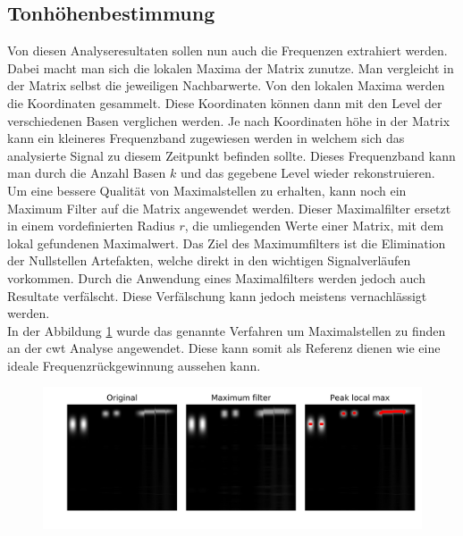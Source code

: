 \subsection{Tonhöhenbestimmung}

Von diesen Analyseresultaten sollen nun auch die Frequenzen extrahiert werden. Dabei macht man sich die lokalen Maxima der Matrix zunutze. Man vergleicht in der Matrix selbst die jeweiligen Nachbarwerte. Von den lokalen Maxima werden die Koordinaten gesammelt. Diese Koordinaten können dann mit den Level der verschiedenen Basen verglichen werden. Je nach Koordinaten höhe in der Matrix kann ein kleineres Frequenzband zugewiesen werden in welchem sich das analysierte Signal zu diesem Zeitpunkt befinden sollte. Dieses Frequenzband kann man durch die Anzahl Basen $k$  und das gegebene Level wieder rekonstruieren.\\

Um eine bessere Qualität von Maximalstellen zu erhalten, kann noch ein Maximum Filter auf die Matrix angewendet werden. Dieser Maximalfilter ersetzt in einem vordefinierten Radius $r$, die umliegenden Werte einer Matrix, mit dem lokal gefundenen Maximalwert. Das Ziel des Maximumfilters ist die Elimination der Nullstellen Artefakten, welche direkt in den wichtigen Signalverläufen vorkommen. Durch die Anwendung eines Maximalfilters werden jedoch auch Resultate verfälscht. Diese Verfälschung kann jedoch meistens vernachlässigt werden.\\

In der Abbildung \ref{fig:cwt_max} wurde das genannte Verfahren um Maximalstellen zu finden an der cwt Analyse angewendet. Diese kann somit als Referenz dienen wie eine ideale Frequenzrückgewinnung aussehen kann. 

\begin{figure}[!ht]
	\centering
	\includegraphics[width=\linewidth]{papers/autotune/sections/frames/images/cwtmaxima.jpg}
	\label{fig:cwt_max}
\end{figure}%

